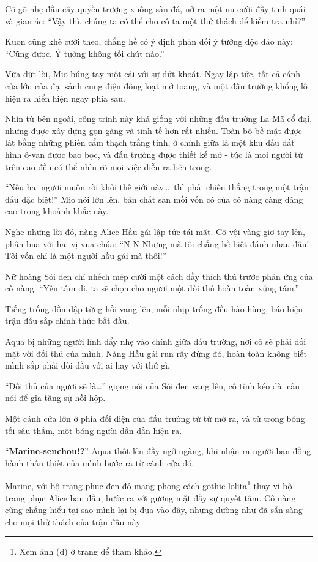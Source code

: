 \documentclass[../main.tex]{subfiles}
\begin{document}
Cô gõ nhẹ đầu cây quyền trượng xuống sàn đá, nở ra một nụ cười đầy tinh quái và gian ác: ``Vậy thì, chúng ta có thể cho cô ta một thử thách để kiểm tra nhỉ?''

Kuon cũng khẽ cười theo, chẳng hề có ý định phản đối ý tưởng độc đáo này: ``Cũng được. Ý tưởng không tồi chút nào.''

Vừa dứt lời, Mio búng tay một cái với sự dứt khoát. Ngay lập tức, tất cả cánh cửa lớn của đại sảnh cung điện đồng loạt mở toang, và một đấu trường khổng lồ hiện ra hiển hiện ngay phía sau.

Nhìn từ bên ngoài, công trình này khá giống với những đấu trường La Mã cổ đại, nhưng được xây dựng gọn gàng và tinh tế hơn rất nhiều. Toàn bộ bề mặt được lát bằng những phiến cẩm thạch trắng tinh, ở chính giữa là một khu đấu đất hình ô-van được bao bọc, và đấu trường được thiết kế mở - tức là mọi người từ trên cao đều có thể nhìn rõ mọi việc diễn ra bên trong.

``Nếu hai ngươi muốn rời khỏi thế giới này\dots\ thì phải chiến thắng trong một trận đấu đặc biệt!'' Mio nói lớn lên, bản chất săn mồi vốn có của cô nàng càng dâng cao trong khoảnh khắc này.

Nghe những lời đó, nàng Alice Hầu gái lập tức tái mặt. Cô vội vàng giơ tay lên, phân bua với hai vị vua chúa: ``N-N-Nhưng mà tôi chẳng hề biết đánh nhau đâu! Tôi vốn chỉ là một người hầu gái mà thôi!''

Nữ hoàng Sói đen chỉ nhếch mép cười một cách đầy thích thú trước phản ứng của cô nàng: ``Yên tâm đi, ta sẽ chọn cho ngươi một đối thủ hoàn toàn xứng tầm.''

Tiếng trống dồn dập từng hồi vang lên, mỗi nhịp trống đều hào hùng, báo hiệu trận đấu sắp chính thức bắt đầu.

Aqua bị những người lính đẩy nhẹ vào chính giữa đấu trường, nơi cô sẽ phải đối mặt với đối thủ của mình. Nàng Hầu gái run rẩy đứng đó, hoàn toàn không biết mình sắp phải đối đầu với ai hay với thứ gì.

``Đối thủ của ngươi sẽ là\dots'' giọng nói của Sói đen vang lên, cố tình kéo dài câu nói để gia tăng sự hồi hộp.

Một cánh cửa lớn ở phía đối diện của đấu trường từ từ mở ra, và từ trong bóng tối sâu thẳm, một bóng người dần dần hiện ra.

``\textbf{Marine-senchou!?}'' Aqua thốt lên đầy ngỡ ngàng, khi nhận ra người bạn đồng hành thân thiết của mình bước ra từ cánh cửa đó.

Marine, với bộ trang phục đen đỏ mang phong cách gothic lolita\footnote{Xem ảnh (d) ở trang \pageref{wonderland} để tham khảo.} thay vì bộ trang phục Alice ban đầu, bước ra với gương mặt đầy sự quyết tâm. Cô nàng cũng chẳng hiểu tại sao mình lại bị đưa vào đây, nhưng dường như đã sẵn sàng cho mọi thử thách của trận đấu này.
\end{document}
